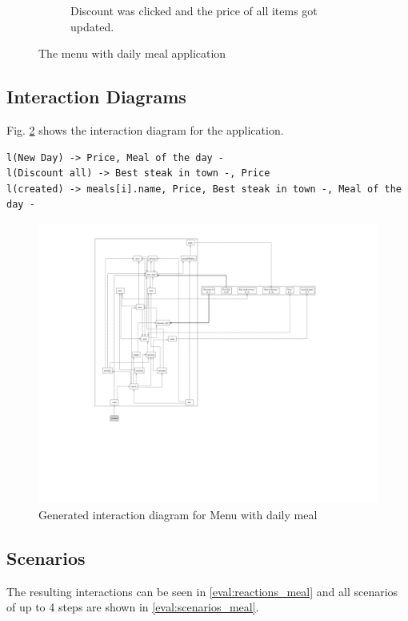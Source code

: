 \begin{figure}[H]
\begin{subfigure}[t]{0.65\textwidth}
        \caption{Discount was clicked and the price of all items got updated.}
    \end{subfigure}
    \caption{The menu with daily meal application }
    \label{fig:eval_image_meal}
\end{figure}
\newpage

\subsection{Interaction Diagrams}
Fig. \ref{fig:diagram_meal_list_properties} shows the interaction diagram for the application.

\label{eval:reactions_meal}
\begin{lstlisting}[language=JavaScriptPlain]
l(New Day) -> Price, Meal of the day -
l(Discount all) -> Best steak in town -, Price
l(created) -> meals[i].name, Price, Best steak in town -, Meal of the day -
\end{lstlisting}
\begin{figure}[H]
    \centering
    \includegraphics[width=\textwidth]{images/diagram_meal.png}
     \caption{Generated interaction diagram for Menu with daily meal}
     \label{fig:diagram_meal_list_properties}
\end{figure}

\subsection{Scenarios}
The resulting interactions can be seen in \ref{eval:reactions_meal} and all scenarios of up to 4 steps are shown in \ref{eval:scenarios_meal}.

